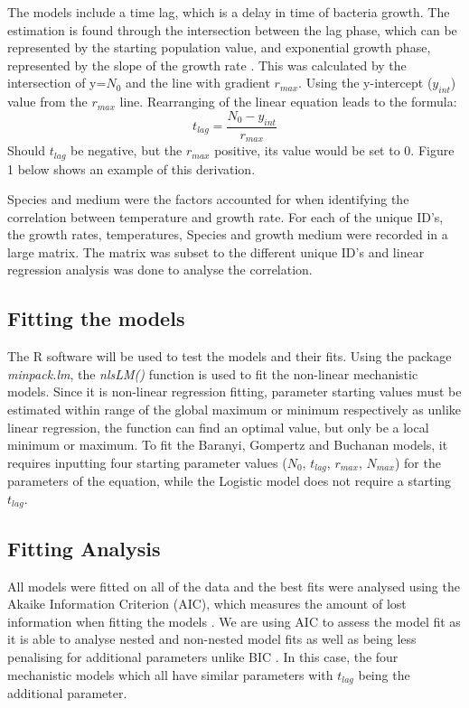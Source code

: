 \documentclass[11pt]{article}
\begin{document}
The models include a time lag, which is a delay in time of bacteria growth. The estimation is found through the intersection between the lag phase, which can be represented by the starting population value, and exponential growth phase, represented by the slope of the growth rate \cite{peleg2011microbial}. This was calculated by the intersection of y=$N_0$ and the line with gradient $r_{max}$. Using the y-intercept ($y_{int}$) value from the $r_{max}$ line. Rearranging of the linear equation leads to the formula:
\begin{equation*}
   t_{lag}=\frac{N_0 - y_{int}}{r_{max}}
\end{equation*}
Should $t_{lag}$ be negative, but the $r_{max}$ positive, its value would be set to $0$. Figure 1 below shows an example of this derivation.

Species and medium were the factors accounted for when identifying the correlation between temperature and growth rate. For each of the unique ID’s, the growth rates, temperatures, Species and growth medium were recorded in a large matrix. The matrix was subset to the different unique ID’s and linear regression analysis was done to analyse the correlation.

\subsection{Fitting the models}

The R software will be used to test the models and their fits. Using the package \textit{minpack.lm}, the \textit{nlsLM()} function is used to fit the non-linear mechanistic models. Since it is non-linear regression fitting, parameter starting values must be estimated within range of the global maximum or minimum respectively as unlike linear regression, the function can find an optimal value, but only be a local minimum or maximum. To fit the Baranyi, Gompertz and Buchanan models, it requires inputting four starting parameter values ($N_0$, $t_{lag}$, $r_{max}$, $N_{max}$) for the parameters of the equation, while the Logistic model does not require a starting $t_{lag}$.

\subsection{Fitting Analysis}

All models were fitted on all of the data and the best fits were analysed using the Akaike Information Criterion (AIC), which measures the amount of lost information when fitting the models \cite{posada2004model}. We are using AIC to assess the model fit as it is able to analyse nested and non-nested model fits as well as being less penalising for additional parameters unlike BIC \cite{posada2004model}. In this case, the four mechanistic models which all have similar parameters with $t_{lag}$ being the additional parameter.
\end{document}
